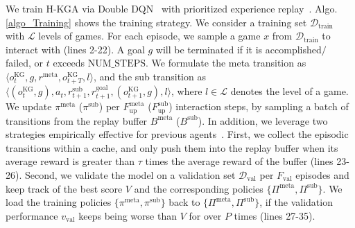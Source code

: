 \documentclass[11pt]{article}
\begin{document}
We train H-KGA via Double DQN~\cite{hasselt2016doubledqn} with prioritized experience replay~\cite{schaul2015per}. 
Algo. \ref{algo_Training} shows the training strategy. 
We consider a training set $\mathcal{D}_{\text{train}}$ with $\mathcal{L}$ levels of games. 
For each episode, we sample a game $x$ from $\mathcal{D}_{\text{train}}$ to interact with (lines 2-22). 
A goal $g$ will be terminated if it is accomplished$/$ failed, or $t$ exceeds $\text{NUM\_STEPS}$. 
We formulate the meta transition as 
         $\langle o_{t}^{\text{KG}}, 
         g, 
         r^\text{meta}, 
         o_{t+T}^{\text{KG}}, l \rangle$, 
and the sub transition as 
         $\langle (o_{t}^{\text{KG}}, g), 
         a_t, 
         r_{t+1}^{\text{sub}}, r_{t+1}^{\text{goal}}, 
         (o_{t+1}^{\text{KG}}, g), l \rangle$, where $l \in \mathcal{L}$ denotes the level of a game.
We update $\pi^{\text{meta}}$ ($\pi^{\text{sub}}$) per $F_{\text{up}}^{\text{meta}}$ ($F_{\text{up}}^{\text{sub}}$) interaction steps, by sampling a batch of transitions from the replay buffer $B^{\text{meta}}$ ($B^{\text{sub}}$). 
In addition, we leverage two strategies empirically effective for previous agents~\cite{adhikari2020gatav2}. 
First, we collect the episodic transitions within a cache, and only push them into the replay buffer when its average reward is greater than $\tau$ times the average reward of the buffer (lines 23-26).
Second, we validate the model on a validation set $\mathcal{D}_{\text{val}}$ per $F_{\text{val}}$ episodes and keep track of the best score $V$ and the corresponding policies $\{ \Pi^{\text{meta}}, \Pi^{\text{sub}} \}$. We load the training policies $\{ \pi^{\text{meta}}, \pi^{\text{sub}} \}$ back to $\{ \Pi^{\text{meta}}, \Pi^{\text{sub}} \}$, if the validation performance $v_{\text{val}}$ keeps being worse than $V$ for over $P$ times (lines 27-35). 
\end{document}
